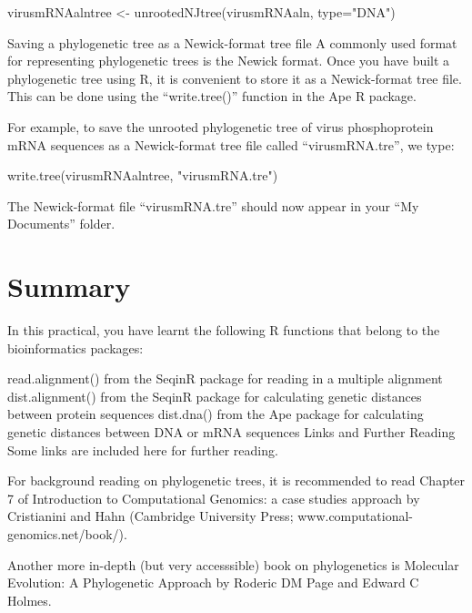 \documentclass[
]{book}
\newenvironment{Shaded}{\begin{snugshade}}{\end{snugshade}}
\newcommand{\AttributeTok}[1]{\textcolor[rgb]{0.77,0.63,0.00}{#1}}
\newcommand{\FunctionTok}[1]{\textcolor[rgb]{0.00,0.00,0.00}{#1}}
\newcommand{\NormalTok}[1]{#1}
\newcommand{\OtherTok}[1]{\textcolor[rgb]{0.56,0.35,0.01}{#1}}
\newcommand{\StringTok}[1]{\textcolor[rgb]{0.31,0.60,0.02}{#1}}
\begin{document}
\begin{Shaded}
\begin{Highlighting}[]
\NormalTok{virusmRNAalntree }\OtherTok{\textless{}{-}} \FunctionTok{unrootedNJtree}\NormalTok{(virusmRNAaln, }\AttributeTok{type=}\StringTok{"DNA"}\NormalTok{)}
\end{Highlighting}
\end{Shaded}

Saving a phylogenetic tree as a Newick-format tree file
A commonly used format for representing phylogenetic trees is the Newick format. Once you have built a phylogenetic tree using R, it is convenient to store it as a Newick-format tree file. This can be done using the ``write.tree()'' function in the Ape R package.

For example, to save the unrooted phylogenetic tree of virus phosphoprotein mRNA sequences as a Newick-format tree file called ``virusmRNA.tre'', we type:

\begin{Shaded}
\begin{Highlighting}[]
\FunctionTok{write.tree}\NormalTok{(virusmRNAalntree, }\StringTok{"virusmRNA.tre"}\NormalTok{)}
\end{Highlighting}
\end{Shaded}

The Newick-format file ``virusmRNA.tre'' should now appear in your ``My Documents'' folder.

\hypertarget{summary-3}{%
\section{Summary}\label{summary-3}}

In this practical, you have learnt the following R functions that belong to the bioinformatics packages:

read.alignment() from the SeqinR package for reading in a multiple alignment
dist.alignment() from the SeqinR package for calculating genetic distances between protein sequences
dist.dna() from the Ape package for calculating genetic distances between DNA or mRNA sequences
Links and Further Reading
Some links are included here for further reading.

For background reading on phylogenetic trees, it is recommended to read Chapter 7 of Introduction to Computational Genomics: a case studies approach by Cristianini and Hahn (Cambridge University Press; www.computational-genomics.net/book/).

Another more in-depth (but very accesssible) book on phylogenetics is Molecular Evolution: A Phylogenetic Approach by Roderic DM Page and Edward C Holmes.
\end{document}

